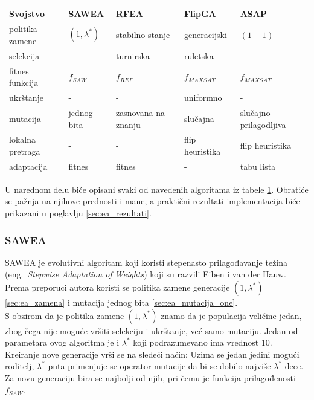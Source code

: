 \documentclass[a4paper]{article}
\begin{document}
\begin{table}[h!]
\centering
{}\label{tab:EA} 
\begin{tabular}{ |p{2.8cm}|p{2.3cm}|p{2.3cm}|p{2.3cm}|p{2.3cm}|}
 \hline
 Svojstvo & SAWEA & RFEA & FlipGA & ASAP \\
 \hline
 politika zamene & $(1, \lambda^*)$ & stabilno stanje & generacijski & $(1 + 1)$ \\
 selekcija & - & turnirska & ruletska & - \\
 fitnes funkcija &	$f_{SAW}$ & $f_{REF}$ & $f_{MAXSAT}$ & $f_{MAXSAT}$ \\
 ukrštanje & - & - & uniformno & - \\
 mutacija & jednog bita & zasnovana na znanju & slučajna & slučajno-prilagodljiva \\
 lokalna pretraga & - & - & flip heuristika & flip heuristika \\
 adaptacija & fitnes & fitnes &  - & tabu lista \\
 \hline
\end{tabular}
\end{table}


U narednom delu biće opisani svaki od navedenih algoritama iz tabele \ref{tab:EA}.
Obratiće se pažnja na njihove prednosti i mane, a praktični rezultati implementacija
biće prikazani u poglavlju \ref{sec:ea_rezultati}.


\subsubsection{SAWEA}
\label{sec:ea_sawea}
SAWEA je evolutivni algoritam koji koristi stepenasto prilagođavanje težina 
(eng.~{\em Stepwise Adaptation of Weights}) \cite{ea_with_table, ea_without_table} 
koji su razvili Eiben i van der Hauw. 
Prema preporuci autora koristi se politika zamene generacije $(1,\lambda^*)$
 \ref{sec:ea_zamena} i mutacija jednog bita \ref{sec:ea_mutacija_one}. \\

S obzirom da je politika zamene $(1,\lambda^*)$ znamo da je populacija veličine jedan,
zbog čega nije moguće vršiti selekciju i ukrštanje, već samo mutaciju. 
Jedan od parametara ovog algoritma je i $\lambda^*$ koji podrazumevano ima vrednost 10.
Kreiranje nove generacije vrši se na sledeći način:
Uzima se jedan jedini mogući roditelj, $\lambda^*$ puta primenjuje se operator mutacije
da bi se dobilo najviše $\lambda^*$ dece. Za novu generaciju bira se najbolji od njih,
pri čemu je funkcija prilagođenosti $f_{SAW}$.\\
\end{document}
